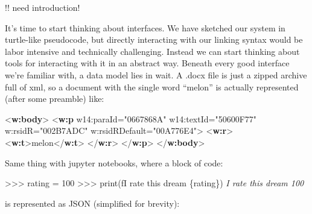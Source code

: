 \documentclass[notoc]{tufte-book}
\newenvironment{Shaded}{}{}
\newcommand{\BuiltInTok}[1]{#1}
\newcommand{\CommentTok}[1]{\textcolor[rgb]{0.38,0.63,0.69}{\textit{#1}}}
\newcommand{\DecValTok}[1]{\textcolor[rgb]{0.25,0.63,0.44}{#1}}
\newcommand{\KeywordTok}[1]{\textcolor[rgb]{0.00,0.44,0.13}{\textbf{#1}}}
\newcommand{\NormalTok}[1]{#1}
\newcommand{\OperatorTok}[1]{\textcolor[rgb]{0.40,0.40,0.40}{#1}}
\newcommand{\OtherTok}[1]{\textcolor[rgb]{0.00,0.44,0.13}{#1}}
\newcommand{\SpecialCharTok}[1]{\textcolor[rgb]{0.25,0.44,0.63}{#1}}
\newcommand{\SpecialStringTok}[1]{\textcolor[rgb]{0.73,0.40,0.53}{#1}}
\newcommand{\StringTok}[1]{\textcolor[rgb]{0.25,0.44,0.63}{#1}}
\begin{document}
 !! need introduction!

It's time to start thinking about interfaces. We have sketched our
system in turtle-like pseudocode, but directly interacting with our
linking syntax would be labor intensive and technically challenging.
Instead we can start thinking about tools for interacting with it in an
abstract way. Beneath every good interface we're familiar with, a data
model lies in wait. A .docx file is just a zipped archive full of xml,
so a document with the single word ``melon'' is actually represented
(after some preamble) like:

\begin{Shaded}
\begin{Highlighting}[]
\NormalTok{\textless{}}\KeywordTok{w:body}\NormalTok{\textgreater{}}
\NormalTok{  \textless{}}\KeywordTok{w:p} 
\OtherTok{    w14:paraId=}\StringTok{"0667868A"} 
\OtherTok{    w14:textId=}\StringTok{"50600F77"} 
\OtherTok{    w:rsidR=}\StringTok{"002B7ADC"} 
\OtherTok{    w:rsidRDefault=}\StringTok{"00A776E4"}\NormalTok{\textgreater{}}
\NormalTok{    \textless{}}\KeywordTok{w:r}\NormalTok{\textgreater{}}
\NormalTok{        \textless{}}\KeywordTok{w:t}\NormalTok{\textgreater{}melon\textless{}/}\KeywordTok{w:t}\NormalTok{\textgreater{}}
\NormalTok{    \textless{}/}\KeywordTok{w:r}\NormalTok{\textgreater{}}
\NormalTok{  \textless{}/}\KeywordTok{w:p}\NormalTok{\textgreater{}  }
\NormalTok{\textless{}/}\KeywordTok{w:body}\NormalTok{\textgreater{}}
\end{Highlighting}
\end{Shaded}

Same thing with jupyter notebooks, where a block of code:

\begin{Shaded}
\begin{Highlighting}[]
\OperatorTok{\textgreater{}\textgreater{}\textgreater{}}\NormalTok{ rating }\OperatorTok{=} \DecValTok{100}
\OperatorTok{\textgreater{}\textgreater{}\textgreater{}} \BuiltInTok{print}\NormalTok{(}\SpecialStringTok{f\textquotesingle{}I rate this dream }\SpecialCharTok{\{}\NormalTok{rating}\SpecialCharTok{\}}\SpecialStringTok{\textquotesingle{}}\NormalTok{)}
\CommentTok{\textquotesingle{}I rate this dream 100\textquotesingle{}}
\end{Highlighting}
\end{Shaded}

is represented as JSON (simplified for brevity):
\end{document}
